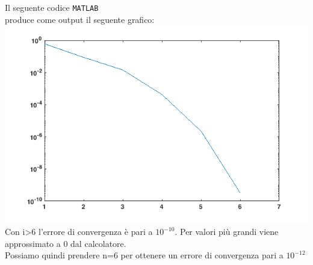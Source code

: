 Il seguente codice \texttt{MATLAB}\\

produce come output il seguente grafico:\\
\includegraphics[scale=0.7]{cap_1/es6/es6.png}\\
Con i>6 l'errore di convergenza è pari a \(10^{-10}\).
Per valori più grandi viene approssimato a 0 dal calcolatore.\\
Possiamo quindi prendere n=6 per ottenere un errore di convergenza pari a \(10^{-12}\)
